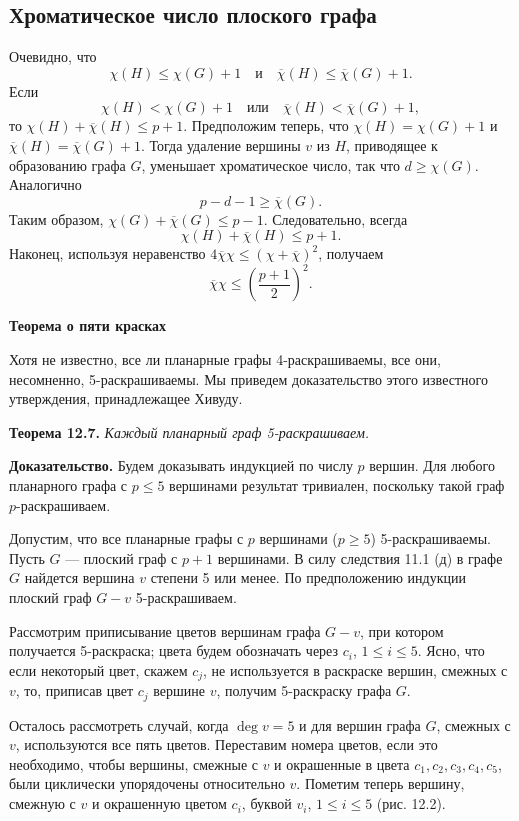 \subsection{Хроматическое число плоского графа}

Очевидно, что
\[
\chi(H) \leq \chi(G) + 1 \quad \text{и} \quad \overline{\chi}(H) \leq \overline{\chi}(G) + 1.
\]
Если
\[
\chi(H) < \chi(G) + 1 \quad \text{или} \quad \overline{\chi}(H) < \overline{\chi}(G) + 1,
\]
то \(\chi(H) + \overline{\chi}(H) \leq p + 1\). Предположим теперь, что \(\chi(H) = \chi(G) + 1\) и \(\overline{\chi}(H) = \overline{\chi}(G) + 1\). Тогда удаление вершины \(v\) из \(H\), приводящее к образованию графа \(G\), уменьшает хроматическое число, так что \(d \geq \chi(G)\). Аналогично
\[
p - d - 1 \geq \overline{\chi}(G).
\]
Таким образом, \(\chi(G) + \overline{\chi}(G) \leq p - 1\). Следовательно, всегда
\[
\chi(H) + \overline{\chi}(H) \leq p + 1.
\]
Наконец, используя неравенство \(4\overline{\chi}\chi \leq (\chi + \overline{\chi})^2\), получаем
\[
\overline{\chi}\chi \leq \left(\frac{p + 1}{2}\right)^2.
\]

\textbf{Теорема о пяти красках}

Хотя не известно, все ли планарные графы 4-раскрашиваемы, все они, несомненно, 5-раскрашиваемы. Мы приведем доказательство этого известного утверждения, принадлежащее Хивуду.

\textbf{Теорема 12.7.} \textit{Каждый планарный граф 5-раскрашиваем.}

\textbf{Доказательство.} Будем доказывать индукцией по числу $p$ вершин. Для любого планарного графа с $p \leq 5$ вершинами результат тривиален, поскольку такой граф $p$-раскрашиваем.

Допустим, что все планарные графы с $p$ вершинами ($p \geq 5$) 5-раскрашиваемы. Пусть $G$ — плоский граф с $p+1$ вершинами. В силу следствия 11.1 (д) в графе $G$ найдется вершина $v$ степени 5 или менее. По предположению индукции плоский граф $G - v$ 5-раскрашиваем.

Рассмотрим приписывание цветов вершинам графа $G - v$, при котором получается 5-раскраска; цвета будем обозначать через $c_i$, $1 \leq i \leq 5$. Ясно, что если некоторый цвет, скажем $c_j$, не используется в раскраске вершин, смежных с $v$, то, приписав цвет $c_j$ вершине $v$, получим 5-раскраску графа $G$.

Осталось рассмотреть случай, когда \(\deg v = 5\) и для вершин графа \(G\), смежных с \(v\), используются все пять цветов. Переставим номера цветов, если это необходимо, чтобы вершины, смежные с \(v\) и окрашенные в цвета \(c_1, c_2, c_3, c_4, c_5\), были циклически упорядочены относительно \(v\). Пометим теперь вершину, смежную с \(v\) и окрашенную цветом \(c_i\), буквой \(v_i\), \(1 \leq i \leq 5\) (рис. 12.2).

